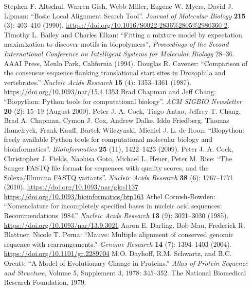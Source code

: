 \documentclass{report}
\begin{document}
\begin{thebibliography}{99}
Stephen F. Altschul, Warren Gish, Webb Miller, Eugene W. Myers, David J. Lipman: ``Basic Local Alignment Search Tool''. \textit{Journal of Molecular Biology} {\bf 215} (3): 403--410 (1990). \url{https://doi.org/10.1016/S0022-2836%2805%2980360-2}.
Timothy L. Bailey and Charles Elkan: ``Fitting a mixture model by expectation maximization to discover motifs in biopolymers'', \textit{Proceedings of the Second International Conference on Intelligent Systems for Molecular Biology} 28--36. AAAI Press, Menlo Park, California (1994).
Douglas R. Cavener: ``Comparison of the consensus sequence flanking translational start sites in Drosophila and vertebrates.'' \textit{Nucleic Acids Research} {\bf 15} (4): 1353--1361 (1987). \url{https://doi.org/10.1093/nar/15.4.1353}
Brad Chapman and Jeff Chang: ``Biopython: Python tools for computational biology''. \textit{ACM SIGBIO Newsletter} {\bf 20} (2): 15--19 (August 2000).
Peter J. A. Cock, Tiago Antao, Jeffrey T. Chang, Brad A. Chapman, Cymon J. Cox, Andrew Dalke, Iddo Friedberg, Thomas Hamelryck, Frank Kauff, Bartek Wilczynski, Michiel J. L. de Hoon: ``Biopython: freely available Python tools for computational molecular biology and bioinformatics''. \textit{Bioinformatics} {\bf 25} (11), 1422--1423 (2009).
Peter J. A. Cock, Christopher J. Fields, Naohisa Goto, Michael L. Heuer, Peter M. Rice: ``The Sanger FASTQ file format for sequences with quality scores, and the Solexa/Illumina FASTQ variants''. \textit{Nucleic Acids Research} {\bf 38} (6): 1767--1771 (2010). \url{https://doi.org/10.1093/nar/gkp1137} \url{https://doi.org/10.1093/bioinformatics/btp163}
Athel Cornish-Bowden: ``Nomenclature for incompletely specified bases in nucleic acid sequences: Recommendations 1984.'' \textit{Nucleic Acids Research} {\bf 13} (9): 3021--3030 (1985). \url{https://doi.org/10.1093/nar/13.9.3021}
Aaron E. Darling, Bob Mau, Frederick R. Blattner, Nicole T. Perna: ``Mauve: Multiple alignment of conserved genomic sequence with rearrangements.'' \textit{Genome Research} {\bf 14} (7): 1394--1403 (2004). \url{https://doi.org/10.1101/gr.2289704}
M.O. Dayhoff, R.M. Schwartz, and B.C. Orcutt: ``A Model of Evolutionary Change in Proteins.'' \textit{Atlas of Protein Sequence and Structure}, Volume 5, Supplement 3, 1978: 345--352. The National Biomedical Research Foundation, 1979.

\end{thebibliography}
\end{document}
